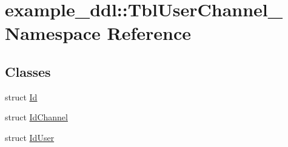 \hypertarget{namespaceexample__ddl_1_1TblUserChannel__}{}\section{example\+\_\+ddl\+:\+:Tbl\+User\+Channel\+\_\+ Namespace Reference}
\label{namespaceexample__ddl_1_1TblUserChannel__}
\subsection*{Classes}
\begin{DoxyCompactItemize}
\item 
struct \hyperlink{structexample__ddl_1_1TblUserChannel___1_1Id}{Id}
\item 
struct \hyperlink{structexample__ddl_1_1TblUserChannel___1_1IdChannel}{Id\+Channel}
\item 
struct \hyperlink{structexample__ddl_1_1TblUserChannel___1_1IdUser}{Id\+User}
\end{DoxyCompactItemize}
